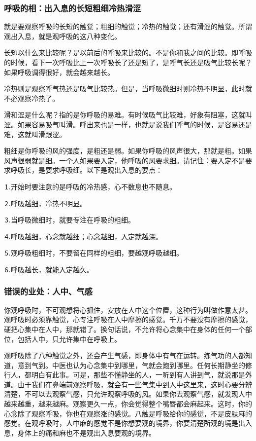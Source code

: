 \documentclass{book}
\begin{document}
\subsubsection{呼吸的相：出入息的长短粗细冷热滑涩}

就是要观察呼吸的长短的触觉；粗细的触觉；冷热的触觉；还有滑涩的触觉。所谓观出入息，就是观呼吸的这八种变化。

长短以什么来比较呢？是以前后的呼吸来比较的。不是你和我之间的比较。即呼吸的时候，看下一次呼吸比上一次呼吸长了还是短了，是呼气长还是吸气比较长呢？如果呼吸调得很好，就会越来越长。

冷热则是观察呼气热还是吸气比较热。但是，当呼吸微细时则冷热不明显，此时就不必观察冷热了。

滑和涩是什么呢？指的是你呼吸的易难。有时候吸气比较难，好象有阻塞，这就叫涩。如果容易吸气叫滑。呼出来也是一样，也就是说我们呼气的时候，是容易还是难，这就叫滑跟涩。

粗细是你呼吸的风的强度，是粗还是弱。如果你呼吸的风声很大，那就是粗。如果风声很弱就是细。一个人如果要入定，他呼吸的风要求细。请记住：要入定不是要求呼吸长，是要求呼吸细。以下是观出入息的要点：

⒈开始时要注意的是呼吸的冷热感，心不数息也不随息。

⒉呼吸越细，冷热不明显。

⒊当呼吸微细时，就要专注在呼吸的粗细。

⒋呼吸越细，心念就越细；心念越细，入定就越深。

⒌观呼吸粗细时，不要留在同样的粗细，要越观呼吸越细。

⒍呼吸越长，就能入定越久。

\subsubsection{错误的业处：人中、气感}

你观呼吸时，不可观想将心抓住，安放在人中这个位置，这种行为叫做作意太甚。观呼吸时必须靠触觉，心专注呼吸在人中摩擦的感觉。千万不要没有摩擦的感觉，硬把心集中在人中，那就错了。换句话说，不允许将心念集中在身体的任何一个部位，包括人中，只允许集中在呼吸上。

观呼吸除了八种触觉之外，还会产生气感，即身体中有气在运转。练气功的人都知道，意到气到。中医也认为心念集中到哪里，气就会跑到哪里。任何长期静坐的修行人，都明白有此事。可是，那些不懂静坐的人，一听到有人讲到气，就说那是外道。由于我们在鼻端前观察呼吸，就会有一些气集中到人中这里来，这时心要分辨清楚，不可以去观察气感，只允许观察呼吸的风。如果你去观察气感，就发现人中越来越重，越来越麻。观察更久一点，你会觉得整个嘴唇都会麻起来。这时，你的心念除了观察呼吸，你也在观察涨的感觉。八触是呼吸给你的感觉，不是皮肤麻的感觉。在观呼吸时，人中麻的感觉不是你想要观的境界，你要清楚所观的境是出入息，身体上的痛和麻也不是观出入息要观的境界。
\end{document}
